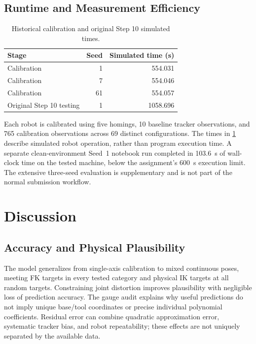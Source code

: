 \documentclass[11pt,letterpaper]{article}
\begin{document}
\subsection{Runtime and Measurement Efficiency}

\begin{table}[!htbp]
\centering\small
\caption{Historical calibration and original Step 10 simulated times.}
\label{tab:time}
\begin{tabular}{@{}lrr@{}}
\toprule
Stage & Seed & Simulated time (s)\\
\midrule
Calibration & 1 & 554.031\\
Calibration & 7 & 554.046\\
Calibration & 61 & 554.057\\
Original Step 10 testing & 1 & 1058.696\\
\bottomrule
\end{tabular}
\end{table}

Each robot is calibrated using five homings, 10 baseline tracker
observations, and 765 calibration observations across 69 distinct
configurations. The times in \cref{tab:time} describe simulated robot
operation, rather than program execution time. A separate clean-environment
Seed~1 notebook run completed in 103.6~s of wall-clock time on the tested
machine, below the assignment's 600~s execution limit. The extensive
three-seed evaluation is supplementary and is not part of the normal
submission workflow.

\section{Discussion}\label{sec:discussion}
\subsection{Accuracy and Physical Plausibility}
The model generalizes from single-axis calibration to mixed continuous poses, meeting FK targets in every tested category and physical IK targets at all random targets. Constraining joint distortion improves plausibility with negligible loss of prediction accuracy. The gauge audit explains why useful predictions do not imply unique base/tool coordinates or precise individual polynomial coefficients. Residual error can combine quadratic approximation error, systematic tracker bias, and robot repeatability; these effects are not uniquely separated by the available data.
\end{document}
